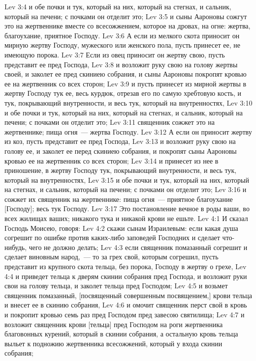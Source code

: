 \vs Lev 3:4 и обе почки и тук, который на них, который на стегнах, и сальник, который на печени; с почками он отделит это;
\vs Lev 3:5 и сыны Аароновы сожгут это на жертвеннике вместе со всесожжением, которое на дровах, на огне:  жертва, благоухание, приятное Господу.
\rsbpar\vs Lev 3:6 А если из мелкого скота приносит он мирную жертву Господу, мужеского или женского пола, пусть принесет ее, не имеющую порока.
\vs Lev 3:7 Если из овец приносит он жертву свою, пусть представит ее пред Господа,
\vs Lev 3:8 и возложит руку свою на голову жертвы своей, и заколет ее пред скиниею собрания, и сыны Аароновы покропят кровью ее на жертвенник со всех сторон;
\vs Lev 3:9 и пусть принесет из мирной жертвы в жертву Господу тук ее, весь курдюк, отрезав его по самую хребтовую кость, и тук, покрывающий внутренности, и весь тук, который на внутренностях,
\vs Lev 3:10 и обе почки и тук, который на них, который на стегнах, и сальник, который на печени; с почками он отделит это;
\vs Lev 3:11 священник сожжет это на жертвеннике;  пища огня~--- жертва Господу.
\rsbpar\vs Lev 3:12 А если он приносит жертву из коз, пусть представит ее пред Господа,
\vs Lev 3:13 и возложит руку свою на голову ее, и заколет ее перед скиниею собрания, и покропят сыны Аароновы кровью ее на жертвенник со всех сторон;
\vs Lev 3:14 и принесет из нее в приношение, в жертву Господу тук, покрывающий внутренности, и весь тук, который на внутренностях,
\vs Lev 3:15 и обе почки и тук, который на них, который на стегнах, и сальник, который на печени; с почками он отделит это;
\vs Lev 3:16 и сожжет их священник на жертвеннике:  пища огня~--- приятное благоухание [Господу]; весь тук Господу.
\vs Lev 3:17 Это постановление вечное в роды ваши, во всех жилищах ваших; никакого тука и никакой крови не ешьте.
\vs Lev 4:1 И сказал Господь Моисею, говоря:
\vs Lev 4:2 скажи сынам Израилевым: если какая душа согрешит по ошибке против каких-либо заповедей Господних и сделает что-нибудь, чего не должно делать;
\vs Lev 4:3 если священник помазанный согрешит и сделает виновным народ,~--- то за грех свой, которым согрешил, пусть представит из крупного скота тельца, без порока, Господу в жертву о грехе,
\vs Lev 4:4 и приведет тельца к дверям скинии собрания пред Господа, и возложит руки свои на голову тельца, и заколет тельца пред Господом;
\vs Lev 4:5 и возьмет священник помазанный, [посвященный совершенным посвящением,] крови тельца и внесет ее в скинию собрания,
\vs Lev 4:6 и омочит священник перст свой в кровь и покропит кровью семь раз пред Господом пред завесою святилища;
\vs Lev 4:7 и возложит священник крови [тельца] пред Господом на роги жертвенника благовонных курений, который в скинии собрания, а остальную кровь тельца выльет к подножию жертвенника всесожжений, который у входа скинии собрания;
